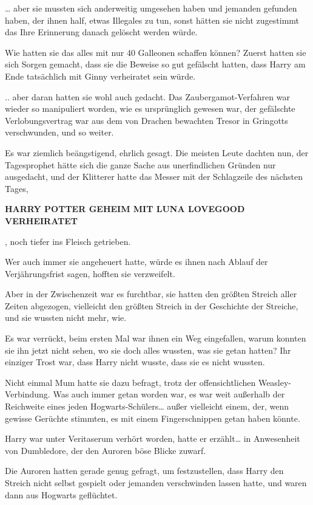 {… aber sie mussten sich anderweitig umgesehen haben und jemanden gefunden haben, der ihnen half, etwas Illegales zu tun, sonst hätten sie nicht zugestimmt das Ihre Erinnerung danach gelöscht werden würde.

Wie hatten sie das alles mit nur 40 Galleonen schaffen können? Zuerst hatten sie sich Sorgen gemacht, dass sie die Beweise so gut gefälscht hatten, dass Harry am Ende tatsächlich mit Ginny verheiratet sein würde.

.. aber daran hatten sie wohl auch gedacht. Das Zaubergamot-Verfahren war wieder so manipuliert worden, wie es ursprünglich gewesen war, der gefälschte Verlobungsvertrag war aus dem von Drachen bewachten Tresor in Gringotts verschwunden, und so weiter.

Es war ziemlich beängstigend, ehrlich gesagt. Die meisten Leute dachten nun, der Tagesprophet hätte sich die ganze Sache aus unerfindlichen Gründen nur ausgedacht, und der Klitterer hatte das Messer mit der Schlagzeile des nächsten Tages,

\textbf{HARRY POTTER GEHEIM MIT LUNA LOVEGOOD VERHEIRATET}

, noch tiefer ins Fleisch getrieben.

Wer auch immer sie angeheuert hatte, würde es ihnen nach Ablauf der Verjährungsfrist sagen, hofften sie verzweifelt.

Aber in der Zwischenzeit war es furchtbar, sie hatten den größten Streich aller Zeiten abgezogen, vielleicht den größten Streich in der Geschichte der Streiche, und sie wussten nicht mehr, wie.

Es war verrückt, beim ersten Mal war ihnen ein Weg eingefallen, warum konnten sie ihn jetzt nicht sehen, wo sie doch alles wussten, was sie getan hatten? Ihr einziger Trost war, dass Harry nicht wusste, dass sie es nicht wussten.

Nicht einmal Mum hatte sie dazu befragt, trotz der offensichtlichen Weasley-Verbindung. Was auch immer getan worden war, es war weit außerhalb der Reichweite eines jeden Hogwarts-Schülers… außer vielleicht einem, der, wenn gewisse Gerüchte stimmten, es mit einem Fingerschnippen getan haben könnte.

Harry war unter Veritaserum verhört worden, hatte er erzählt… in Anwesenheit von Dumbledore, der den Auroren böse Blicke zuwarf.

Die Auroren hatten gerade genug gefragt, um festzustellen, dass Harry den Streich nicht selbst gespielt oder jemanden verschwinden lassen hatte, und waren dann aus Hogwarts geflüchtet.

}
